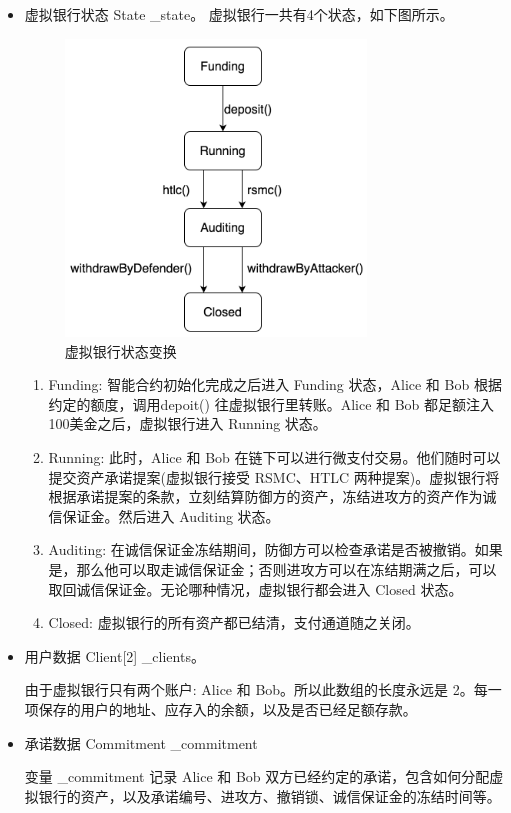 \begin{itemize}
    \item 虚拟银行状态 State \_state。
        虚拟银行一共有4个状态，如下图所示。
        \begin{figure}[h!]
            \centering
            \includegraphics[width=8cm, keepaspectratio]{../images/state_machine.png}
            \caption{虚拟银行状态变换}
            \label{fig:state_machince}
        \end{figure}
        \begin{enumerate}
            \item Funding: 智能合约初始化完成之后进入 Funding 状态，Alice 和 Bob 根据约定的额度，调用depoit() 往虚拟银行里转账。Alice 和 Bob 都足额注入100美金之后，虚拟银行进入 Running 状态。
            \item Running: 此时，Alice 和 Bob 在链下可以进行微支付交易。他们随时可以提交资产承诺提案(虚拟银行接受 RSMC、HTLC 两种提案)。虚拟银行将根据承诺提案的条款，立刻结算防御方的资产，冻结进攻方的资产作为诚信保证金。然后进入 Auditing 状态。
            \item Auditing: 在诚信保证金冻结期间，防御方可以检查承诺是否被撤销。如果是，那么他可以取走诚信保证金；否则进攻方可以在冻结期满之后，可以取回诚信保证金。无论哪种情况，虚拟银行都会进入 Closed 状态。
            \item Closed: 虚拟银行的所有资产都已结清，支付通道随之关闭。
        \end{enumerate}

    \item 用户数据 Client[2] \_clients。
    
    由于虚拟银行只有两个账户: Alice 和 Bob。所以此数组的长度永远是 2。每一项保存的用户的地址、应存入的余额，以及是否已经足额存款。
    
    \item 承诺数据 Commitment \_commitment
    
    变量 \_commitment 记录 Alice 和 Bob 双方已经约定的承诺，包含如何分配虚拟银行的资产，以及承诺编号、进攻方、撤销锁、诚信保证金的冻结时间等。
    
\end{itemize}


